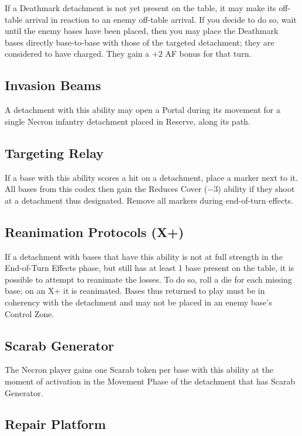 If a Deathmark detachment is not yet present on the table, it may make its off-table arrival in reaction to an enemy off-table arrival. If you decide to do so, wait until the enemy bases have been placed, then you may place the Deathmark bases directly base-to-base with those of the targeted detachment; they are considered to have charged. They gain a $+2$ AF bonus for that turn.

\subsection{Invasion Beams}

A detachment with this ability may open a Portal during its movement for a single Necron infantry detachment placed in Reserve, along its path.

\subsection{Targeting Relay}

If a base with this ability scores a hit on a detachment, place a marker next to it. All bases from this codex then gain the Reduces Cover ($-3$) ability if they shoot at a detachment thus designated. Remove all markers during end-of-turn effects.

\subsection{Reanimation Protocols (X+)}

If a detachment with bases that have this ability is not at full strength in the End-of-Turn Effects phase, but still has at least 1 base present on the table, it is possible to attempt to reanimate the losses. To do so, roll a die for each missing base; on an X+ it is reanimated. Bases thus returned to play must be in coherency with the detachment and may not be placed in an enemy base's Control Zone.

\subsection{Scarab Generator}

The Necron player gains one Scarab token per base with this ability at the moment of activation in the Movement Phase of the detachment that has Scarab Generator.

\subsection{Repair Platform}

